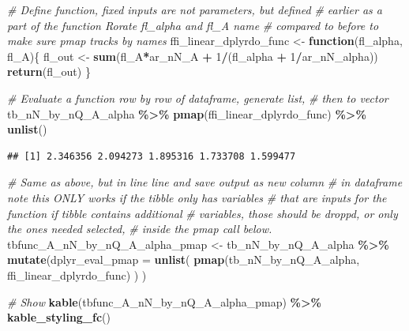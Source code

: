 \documentclass[
]{book}
\newenvironment{Shaded}{\begin{snugshade}}{\end{snugshade}}
\newcommand{\CommentTok}[1]{\textcolor[rgb]{0.56,0.35,0.01}{\textit{#1}}}
\newcommand{\ControlFlowTok}[1]{\textcolor[rgb]{0.13,0.29,0.53}{\textbf{#1}}}
\newcommand{\DataTypeTok}[1]{\textcolor[rgb]{0.13,0.29,0.53}{#1}}
\newcommand{\DecValTok}[1]{\textcolor[rgb]{0.00,0.00,0.81}{#1}}
\newcommand{\KeywordTok}[1]{\textcolor[rgb]{0.13,0.29,0.53}{\textbf{#1}}}
\newcommand{\NormalTok}[1]{#1}
\newcommand{\OperatorTok}[1]{\textcolor[rgb]{0.81,0.36,0.00}{\textbf{#1}}}
\newcommand{\StringTok}[1]{\textcolor[rgb]{0.31,0.60,0.02}{#1}}
\begin{document}
\begin{Shaded}
\begin{Highlighting}[]
\CommentTok{\# Define function, fixed inputs are not parameters, but defined}
\CommentTok{\# earlier as a part of the function Rorate fl\_alpha and fl\_A name}
\CommentTok{\# compared to before to make sure pmap tracks by names}
\NormalTok{ffi\_linear\_dplyrdo\_func \textless{}{-}}\StringTok{ }\ControlFlowTok{function}\NormalTok{(fl\_alpha, fl\_A)\{}
\NormalTok{  fl\_out \textless{}{-}}\StringTok{ }\KeywordTok{sum}\NormalTok{(fl\_A}\OperatorTok{*}\NormalTok{ar\_nN\_A }\OperatorTok{+}\StringTok{ }\DecValTok{1}\OperatorTok{/}\NormalTok{(fl\_alpha }\OperatorTok{+}\StringTok{ }\DecValTok{1}\OperatorTok{/}\NormalTok{ar\_nN\_alpha))}
  \KeywordTok{return}\NormalTok{(fl\_out)}
\NormalTok{\}}

\CommentTok{\# Evaluate a function row by row of dataframe, generate list,}
\CommentTok{\# then to vector}
\NormalTok{tb\_nN\_by\_nQ\_A\_alpha }\OperatorTok{\%\textgreater{}\%}\StringTok{ }\KeywordTok{pmap}\NormalTok{(ffi\_linear\_dplyrdo\_func) }\OperatorTok{\%\textgreater{}\%}\StringTok{ }\KeywordTok{unlist}\NormalTok{()}
\end{Highlighting}
\end{Shaded}

\begin{verbatim}
## [1] 2.346356 2.094273 1.895316 1.733708 1.599477
\end{verbatim}

\begin{Shaded}
\begin{Highlighting}[]
\CommentTok{\# Same as above, but in line line and save output as new column}
\CommentTok{\# in dataframe note this ONLY works if the tibble only has variables}
\CommentTok{\# that are inputs for the function if tibble contains additional}
\CommentTok{\#  variables, those should be droppd, or only the ones needed selected,}
\CommentTok{\# inside the pmap call below.}
\NormalTok{tbfunc\_A\_nN\_by\_nQ\_A\_alpha\_pmap \textless{}{-}}\StringTok{ }\NormalTok{tb\_nN\_by\_nQ\_A\_alpha }\OperatorTok{\%\textgreater{}\%}
\StringTok{  }\KeywordTok{mutate}\NormalTok{(}\DataTypeTok{dplyr\_eval\_pmap =}
           \KeywordTok{unlist}\NormalTok{(}
             \KeywordTok{pmap}\NormalTok{(tb\_nN\_by\_nQ\_A\_alpha, ffi\_linear\_dplyrdo\_func)}
\NormalTok{           )}
\NormalTok{  )}

\CommentTok{\# Show}
\KeywordTok{kable}\NormalTok{(tbfunc\_A\_nN\_by\_nQ\_A\_alpha\_pmap) }\OperatorTok{\%\textgreater{}\%}
\StringTok{  }\KeywordTok{kable\_styling\_fc}\NormalTok{()}
\end{Highlighting}
\end{Shaded}
\end{document}
